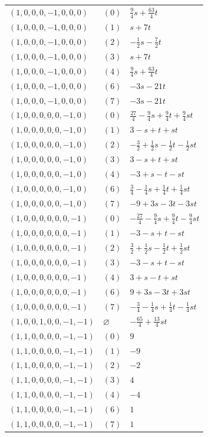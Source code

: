 \begin{longtable}{@{}lll@{}}
$(1,0,0,0,-1,0,0,0)$ & $(0)$ & $\frac{9}{4}s+\frac{63}{4}t$\\
$(1,0,0,0,-1,0,0,0)$ & $(1)$ & $s+7t$\\
$(1,0,0,0,-1,0,0,0)$ & $(2)$ & $-\frac{1}{2}s-\frac{7}{2}t$\\
$(1,0,0,0,-1,0,0,0)$ & $(3)$ & $s+7t$\\
$(1,0,0,0,-1,0,0,0)$ & $(4)$ & $\frac{9}{4}s+\frac{63}{4}t$\\
$(1,0,0,0,-1,0,0,0)$ & $(6)$ & $-3s-21t$\\
$(1,0,0,0,-1,0,0,0)$ & $(7)$ & $-3s-21t$\\
$(1,0,0,0,0,0,-1,0)$ & $(0)$ & $\frac{27}{4}-\frac{9}{4}s+\frac{9}{4}t+\frac{9}{4}st$\\
$(1,0,0,0,0,0,-1,0)$ & $(1)$ & $3-s+t+st$\\
$(1,0,0,0,0,0,-1,0)$ & $(2)$ & $-\frac{3}{2}+\frac{1}{2}s-\frac{1}{2}t-\frac{1}{2}st$\\
$(1,0,0,0,0,0,-1,0)$ & $(3)$ & $3-s+t+st$\\
$(1,0,0,0,0,0,-1,0)$ & $(4)$ & $-3+s-t-st$\\
$(1,0,0,0,0,0,-1,0)$ & $(6)$ & $\frac{3}{4}-\frac{1}{4}s+\frac{1}{4}t+\frac{1}{4}st$\\
$(1,0,0,0,0,0,-1,0)$ & $(7)$ & $-9+3s-3t-3st$\\
$(1,0,0,0,0,0,0,-1)$ & $(0)$ & $-\frac{27}{4}-\frac{9}{4}s+\frac{9}{4}t-\frac{9}{4}st$\\
$(1,0,0,0,0,0,0,-1)$ & $(1)$ & $-3-s+t-st$\\
$(1,0,0,0,0,0,0,-1)$ & $(2)$ & $\frac{3}{2}+\frac{1}{2}s-\frac{1}{2}t+\frac{1}{2}st$\\
$(1,0,0,0,0,0,0,-1)$ & $(3)$ & $-3-s+t-st$\\
$(1,0,0,0,0,0,0,-1)$ & $(4)$ & $3+s-t+st$\\
$(1,0,0,0,0,0,0,-1)$ & $(6)$ & $9+3s-3t+3st$\\
$(1,0,0,0,0,0,0,-1)$ & $(7)$ & $-\frac{3}{4}-\frac{1}{4}s+\frac{1}{4}t-\frac{1}{4}st$\\
$(1,0,0,1,0,0,-1,-1)$ & $\varnothing$ & $-\frac{65}{4}+\frac{13}{4}st$\\
$(1,1,0,0,0,0,-1,-1)$ & $(0)$ & $9$\\
$(1,1,0,0,0,0,-1,-1)$ & $(1)$ & $-9$\\
$(1,1,0,0,0,0,-1,-1)$ & $(2)$ & $-2$\\
$(1,1,0,0,0,0,-1,-1)$ & $(3)$ & $4$\\
$(1,1,0,0,0,0,-1,-1)$ & $(4)$ & $-4$\\
$(1,1,0,0,0,0,-1,-1)$ & $(6)$ & $1$\\
$(1,1,0,0,0,0,-1,-1)$ & $(7)$ & $1$\\
\end{longtable}
\endgroup
